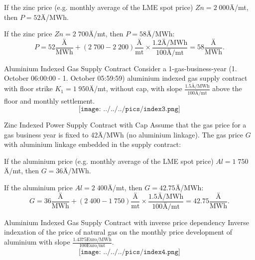 


	If the zinc price (e.g. monthly average of the LME spot price) $Zn=2\;000$Ä/mt, then \textcolor[rgb]{0.00,0.00,1.00}{$P=52$Ä/MWh}.

	If the zinc price $Zn=2\;700$Ä/mt, then \textcolor[rgb]{0.00,0.00,1.00}{$P=58$Ä/MWh}:
  $$P=52\frac{\text{Ä}}{\text{MWh}}+(2\;700-2\;200)\frac{\text{Ä}}{\text{mt}}\times\frac{1.2\text{Ä/MWh}}{100\text{Ä/mt}}=58\frac{\text{Ä}}{\text{MWh}}.$$






{Aluminium Indexed Gas Supply Contract}
Consider a 1-gas-business-year (1. October 06:00:00 - 1. October 05:59:59) aluminium indexed gas supply contract with floor strike $K_1=1\;950$Ä/mt, without cap, with slope $\frac{1.5\text{Ä/MWh}}{100\text{Ä/mt}}$ above the floor and monthly settlement.
$$\texttt{[image: ../../../pics/index3.png]}$$

{Zinc Indexed Power Supply Contract with Cap}
Assume that the gas price for a gas business year is fixed to \textcolor[rgb]{1.00,0.00,0.00}{42Ä/MWh} (no aluminium linkage). The gas price $G$ with aluminium linkage embedded in the supply contract:
\vspace{0.4cm}






	If the aluminium price (e.g. monthly average of the LME spot price) $Al=1\;750$Ä/mt, then \textcolor[rgb]{0.00,0.00,1.00}{$G=36$Ä/MWh}.

	If the aluminium price $Al=2\;400$Ä/mt, then \textcolor[rgb]{0.00,0.00,1.00}{$G=42.75$Ä/MWh}:
  $$G=36\frac{\text{Ä}}{\text{MWh}}+(2\;400-1\;750)\frac{\text{Ä}}{\text{mt}}\times\frac{1.5\text{Ä/MWh}}{100\text{Ä/mt}}=42.75\frac{\text{Ä}}{\text{MWh}}.$$






{Aluminium Indexed Gas Supply Contract with inverse price dependency}
Inverse indexation of the price of natural gas on the monthly price development of aluminium with slope $\frac{1.4375\text{Euro/MWh}}{100\text{Euro/mt}}$.
$$\texttt{[image: ../../../pics/index4.png]}$$

